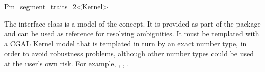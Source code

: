 
\ccRefPageBegin


\begin{ccRefClass}{Pm_segment_traits_2<Kernel>}
    
\ccDefinition 
  The interface class  is a model of the
   concept. It is provided as part of the package and
  can be used as reference for resolving ambiguities.
  It must be templated with a CGAL Kernel model that is templated in turn
  by an exact number type, in order to avoid robustness problems, 
  although other number types could be used at the user's own risk.
  For example, ,
  ,
  .

 
\ccIsModel

\end{ccRefClass} %

\ccRefPageEnd
